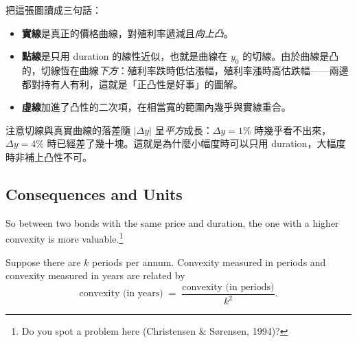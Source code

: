 \suppstart
\begin{remark}
	把這張圖讀成三句話：
	\begin{itemize}[nosep]
		\item \textbf{實線}是真正的價格曲線，對殖利率遞減且\emph{向上凸}。
		\item \textbf{點線}是只用 duration 的線性近似，也就是曲線在 $y_{0}$ 的切線。由於曲線是凸的，切線恆在曲線\emph{下方}：殖利率跌時低估漲幅，殖利率漲時高估跌幅——兩邊都對持有人有利，這就是「正凸性是好事」的圖解。
		\item \textbf{虛線}加進了凸性的二次項，在相當寬的範圍內幾乎與實線重合。
	\end{itemize}
	\smallskip
	注意切線與真實曲線的落差隨 $|\Delta y|$ 呈\emph{平方}成長：$\Delta y = 1\%$ 時幾乎看不出來，$\Delta y = 4\%$ 時已經差了幾十塊。這就是為什麼小幅度時可以只用 duration，大幅度時非補上凸性不可。
\end{remark}
\suppend

\subsection{Consequences and Units}


So between two bonds with the same price and duration, the one with a higher convexity is more valuable.\footnote{Do you spot a problem here (Christensen \& S\o rensen, 1994)?}

Suppose there are $k$ periods per annum.
Convexity measured in periods and convexity measured in years are related by
\begin{equation}
	\text{convexity (in years)} \;=\; \frac{\text{convexity (in periods)}}{k^{2}} . \label{eq:convexity-years}
\end{equation}

